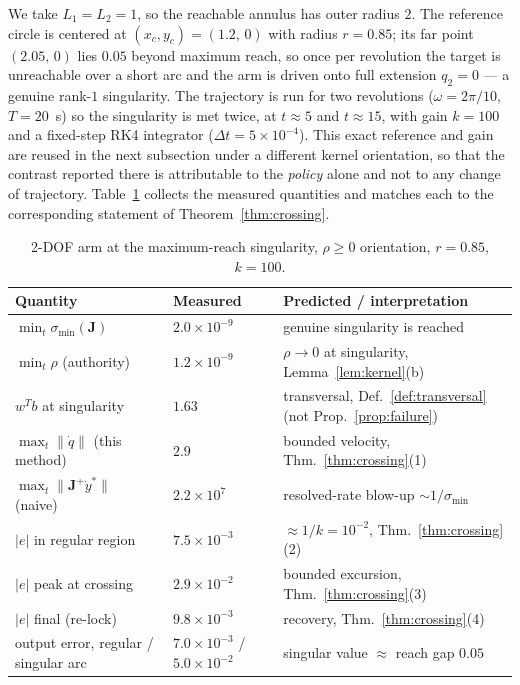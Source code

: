 \documentclass[11pt,american]{article}
\theoremstyle{definition}
\theoremstyle{plain}
\theoremstyle{remark}
\begin{document}
We take $L_1 = L_2 = 1$, so the reachable annulus has outer radius $2$. The reference circle is centered at $(x_c,y_c) = (1.2,\,0)$ with radius $r = 0.85$; its far point $(2.05,\,0)$ lies $0.05$ beyond maximum reach, so once per revolution the target is unreachable over a short arc and the arm is driven onto full extension $q_2 = 0$ --- a genuine rank-$1$ singularity. The trajectory is run for two revolutions ($\omega = 2\pi/10$, $T = 20$~s) so the singularity is met twice, at $t \approx 5$ and $t \approx 15$, with gain $k = 100$ and a fixed-step RK4 integrator ($\Delta t = 5\times 10^{-4}$). This exact reference and gain are reused in the next subsection under a different kernel orientation, so that the contrast reported there is attributable to the \emph{policy} alone and not to any change of trajectory. Table~\ref{tab:arm} collects the measured quantities and matches each to the corresponding statement of Theorem~\ref{thm:crossing}.

\begin{table}[h]
\centering
\begin{tabular}{l l l}
\hline
Quantity & Measured & Predicted / interpretation \\
\hline
$\min_t \sigma_{\min}(\mathbf{J})$ & $2.0\times 10^{-9}$ & genuine singularity is reached \\
$\min_t \rho$ (authority) & $1.2\times 10^{-9}$ & $\rho\to 0$ at singularity, Lemma~\ref{lem:kernel}(b) \\
$w^T b$ at singularity & $1.63$ & transversal, Def.~\ref{def:transversal} (not Prop.~\ref{prop:failure}) \\
$\max_t \|\dot q\|$ (this method) & $2.9$ & bounded velocity, Thm.~\ref{thm:crossing}(1) \\
$\max_t \|\mathbf{J}^{+}\dot y^*\|$ (naive) & $2.2\times 10^{7}$ & resolved-rate blow-up $\sim 1/\sigma_{\min}$ \\
$|e|$ in regular region & $7.5\times 10^{-3}$ & $\approx 1/k = 10^{-2}$, Thm.~\ref{thm:crossing}(2) \\
$|e|$ peak at crossing & $2.9\times 10^{-2}$ & bounded excursion, Thm.~\ref{thm:crossing}(3) \\
$|e|$ final (re-lock) & $9.8\times 10^{-3}$ & recovery, Thm.~\ref{thm:crossing}(4) \\
output error, regular / singular arc & $7.0\times 10^{-3}$ / $5.0\times 10^{-2}$ & singular value $\approx$ reach gap $0.05$ \\
\hline
\end{tabular}
\caption{2-DOF arm at the maximum-reach singularity, $\rho\ge0$ orientation, $r=0.85$, $k=100$.}
\label{tab:arm}
\end{table}
\end{document}
